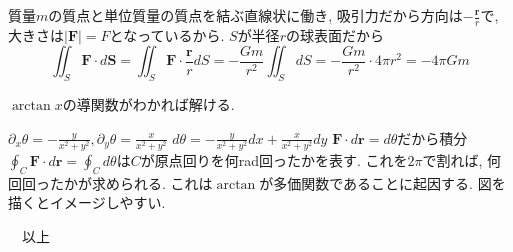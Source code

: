 \documentclass[a4j,dvipdfmx]{jsarticle}
\begin{document}
\begin{qparts}
\begin{qlist}
                \qitem 質量$m$の質点と単位質量の質点を結ぶ直線状に働き, 吸引力だから方向は$-\frac{\bm{r}}{r}$で, 大きさは$|\bm{F}|=F$となっているから.
                \qitem $S$が半径$r$の球表面だから
                    \begin{equation*}
                        \iint_S \bm{F}\cdot d\bm{S} =\iint_S\bm{F}\cdot \frac{\bm{r}}{r}dS=-\frac{Gm}{r^2}\iint_S dS=-\frac{Gm}{r^2}\cdot 4\pi r^2 =-4\pi Gm
                    \end{equation*}
            \end{qlist}
        \qpart $\arctan x$の導関数がわかれば解ける.
            \begin{qlist}
                \qitem $\partial_x \theta=-\frac{y}{x^2+y^2},\partial_y \theta=\frac{x}{x^2+y^2}$
                \qitem $d\theta=-\frac{y}{x^2+y^2}dx+\frac{x}{x^2+y^2}dy$
                \qitem $\bm{F}\cdot d\bm{r}=d\theta$だから積分$\oint_C \bm{F}\cdot d\bm{r}=\oint_C d\theta$は$C$が原点回りを何rad回ったかを表す.
                これを$2\pi$で割れば, 何回回ったかが求められる. これは$\arctan$が多価関数であることに起因する.
                図を描くとイメージしやすい.
            \end{qlist}
        \end{qparts}
    \color{black}
    \hrulefill 　以上　\hrulefill
\end{document}
